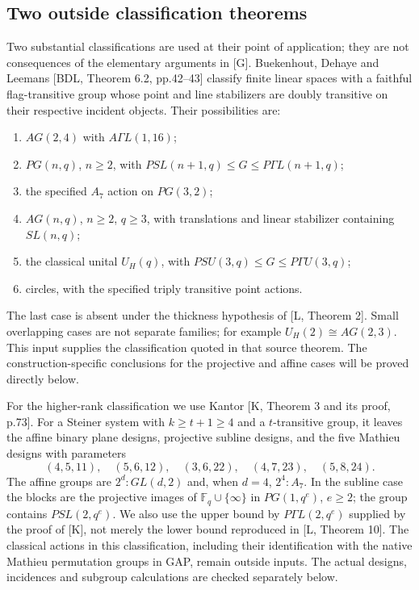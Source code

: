\subsection{Two outside classification theorems}
Two substantial classifications are used at their point of application;
they are not consequences of the elementary arguments in [G].
Buekenhout, Dehaye and Leemans [BDL, Theorem 6.2, pp.42--43] classify
finite linear spaces with a faithful flag-transitive group whose point
and line stabilizers are doubly transitive on their respective incident
objects. Their possibilities are:
\begin{enumerate}
\item $AG(2,4)$ with $A\Gamma L(1,16)$;
\item $PG(n,q)$, $n\geq2$, with
$PSL(n+1,q)\leq G\leq P\Gamma L(n+1,q)$;
\item the specified $A_7$ action on $PG(3,2)$;
\item $AG(n,q)$, $n\geq2$, $q\geq3$, with translations and linear
stabilizer containing $SL(n,q)$;
\item the classical unital $U_H(q)$, with
$PSU(3,q)\leq G\leq P\Gamma U(3,q)$;
\item circles, with the specified triply transitive point actions.
\end{enumerate}
The last case is absent under the thickness hypothesis of [L, Theorem 2].
Small overlapping cases are not separate families; for example
$U_H(2)\cong AG(2,3)$. This input supplies the classification quoted in
that source theorem. The construction-specific conclusions for the
projective and affine cases will be proved directly below.

For the higher-rank classification we use Kantor [K, Theorem 3 and its
proof, p.73]. For a Steiner system with $k\geq t+1\geq4$ and a
$t$-transitive group, it leaves the affine binary plane designs,
projective subline designs, and the five Mathieu designs with parameters
\[
(4,5,11),\quad(5,6,12),\quad(3,6,22),\quad(4,7,23),\quad(5,8,24).
\]
The affine groups are $2^d:GL(d,2)$ and, when $d=4$, $2^4:A_7$.
In the subline case the blocks are the projective images of
$\mathbb F_q\cup\{\infty\}$ in $PG(1,q^e)$, $e\geq2$; the group
contains $PSL(2,q^e)$. We also use the upper bound by
$P\Gamma L(2,q^e)$ supplied by the proof of [K], not merely the lower
bound reproduced in [L, Theorem 10]. The classical actions in this
classification, including their identification with the native Mathieu
permutation groups in GAP, remain outside inputs. The actual designs,
incidences and subgroup calculations are checked separately below.
